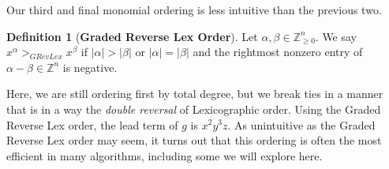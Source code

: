 \documentclass[MS, xcolor=dvipsnames]{wfuthesis}
\def\bZ{\mathbb{Z}}
\theoremstyle{definition}
\newtheorem{definition}[theorem]{Definition}
\begin{document}
Our third and final monomial ordering is less intuitive than the previous two.
\begin{definition}[\bf Graded Reverse Lex Order]
  Let $\alpha,\beta \in \bZ_{\ge0}^n$. We say $x^\alpha >_{GRevLex} x^\beta$ if $|\alpha| > |\beta|$ or $|\alpha|=|\beta|$ and the rightmost nonzero entry of $\alpha - \beta \in \bZ^n$ is negative.
\end{definition}
Here, we are still ordering first by total degree, but we break ties in a manner that is in a way the \emph{double reversal} of Lexicographic order. Using the Graded Reverse Lex order, the lead term of $g$ is $x^2y^3z$. As unintuitive as the Graded Reverse Lex order may seem, it turns out that this ordering is often the most efficient in many algorithms, including some we will explore here.

\end{document}
